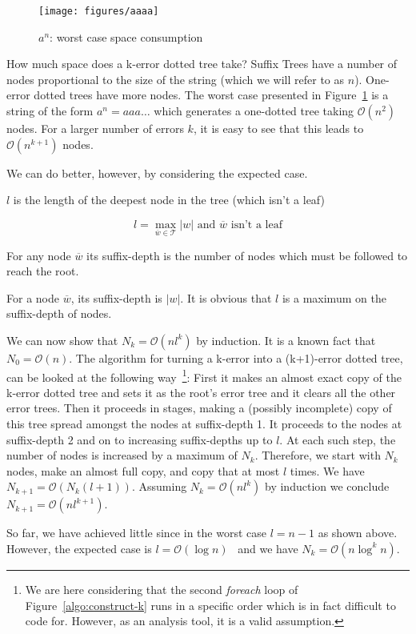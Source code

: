 \begin{figure}
\centering
\texttt{[image: figures/aaaa]}
\caption{$a^n$: worst case space consumption}%
\label{fig:aaaa}
\end{figure}

How much space does a k-error dotted tree take? Suffix Trees have a number of nodes proportional to the size of the string (which we will refer to as $n$). One-error dotted trees have more nodes. The worst case presented in Figure~\ref{fig:aaaa} is a string of the form $a^n = aaa\dots$ which generates a one-dotted tree taking $\mathcal{O}(n^2)$ nodes. For a larger number of errors $k$, it is easy to see that this leads to $\mathcal{O}(n^{k+1})$ nodes.

We can do better, however, by considering the expected case.

\begin{definition}
$l$ is the length of the deepest node in the tree (which isn't a leaf)

\[ l = \max_{\overline{w} \in \mathcal{T}} |w| \mbox{ and $\overline{w}$ isn't a leaf} \]
\end{definition}

\begin{definition}
For any node $\overline{w}$ its suffix-depth is the number of nodes which must be followed to reach the root.
\end{definition}

For a node $\overline{w}$, its suffix-depth is $|w|$. It is obvious that $l$ is a maximum on the suffix-depth of nodes.

We can now show that $N_k = \mathcal{O}(nl^k)$ by induction. It is a known fact that $N_0 = \mathcal{O}(n)$. The algorithm for turning a k-error into a (k+1)-error dotted tree, can be looked at the following way~\footnote{We are here considering that the second \textit{foreach} loop of Figure~\ref{algo:construct-k} runs in a specific order which is in fact difficult to code for. However, as an analysis tool, it is a valid assumption.}: First it makes an almost exact copy of the k-error dotted tree and sets it as the root's error tree and it clears all the other error trees. Then it proceeds in stages, making a (possibly incomplete) copy of this tree spread amongst the nodes at suffix-depth 1. It proceeds to the nodes at suffix-depth 2 and on to increasing suffix-depths up to $l$. At each such step, the number of nodes is increased by a maximum of $N_k$. Therefore, we start with $N_k$ nodes, make an almost full copy, and copy that at most $l$ times. We have $N_{k+1}=\mathcal{O}(N_k(l+1))$. Assuming $N_k=\mathcal{O}(nl^k)$ by induction we conclude $N_{k+1}=\mathcal{O}(nl^{k+1})$.

So far, we have achieved little since in the worst case $l=n-1$ as shown above. However, the expected case is $l=\mathcal{O}(\log n)$~\cite{apostolico92selfalignments,szpankowski:unexpected} and we have $N_k=\mathcal{O}(n\log^k n)$.
